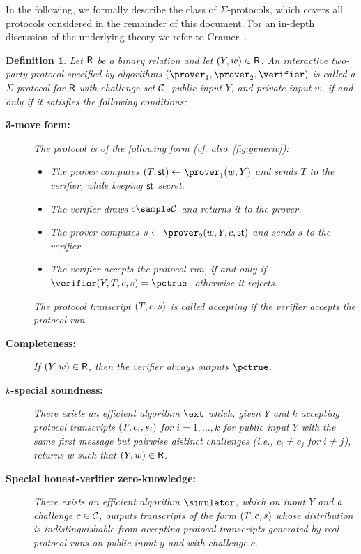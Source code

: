 \documentclass[runningheads,11pt]{article}
\newtheorem{definition}{Definition}
\begin{document}
In the following, we formally describe the class of $\Sigma$-protocols, which covers all protocols considered in the remainder of this document.
 For an in-depth discussion of the underlying theory we refer to Cramer~\cite{cramer97}.
\begin{definition}\label{def:sigma}
  Let $\mathsf{R}$ be a binary relation and let $(Y,w)\in\mathsf{R}$.
  An interactive two-party protocol specified by algorithms $(\prover_1,\prover_2,\verifier)$ is called a \emph{$\Sigma$-protocol} for $\mathsf{R}$ with challenge set $\mathcal{C}$, public input $Y$, and private input $w$, if and only if it satisfies the following conditions:
  \begin{description}
    \item[\bf 3-move form:]
      The protocol is of the following form (cf. also~\cref{fig:generic}):
      \begin{itemize}
        \item
          The prover computes $(\commitment,\st) \gets \prover_1(\witness,\statement)$ and sends $T$ to the verifier, while keeping $\mathsf{st}$ secret.
        \item
          The verifier draws $c\sample\CS$ and returns it to the prover.
        \item
          The prover computes $s\gets\prover_2(\witness,\statement,\challenge,\st)$ and sends $s$ to the verifier.
        \item
          The verifier accepts the protocol run, if and only if $\verifier(Y, T,\challenge,s)=\accept$, otherwise it rejects.
      \end{itemize}
      The protocol transcript $(T,c,s)$ is called \emph{accepting} if the verifier accepts the protocol run.
    \item[\bf Completeness:]
      If $(Y,w)\in\mathsf{R}$, then the verifier always outputs $\accept$.
    \item[\bf $k$-special soundness:]
      There exists an efficient algorithm $\ext$ which, given $Y$ and $k$ accepting protocol transcripts $(T,c_i,s_i)$ for $i=1,\dots,k$ for public input $Y$ with the same first message but pairwise distinct challenges (i.e., $c_i\ne c_j$ for $i\ne j$), returns $w$ such that $(Y,w)\in\mathsf{R}$.
      \item[\bf Special honest-verifier zero-knowledge:]
      There exists an efficient algorithm $\simulator$, which on input $Y$ and a challenge $c\in\mathcal{C}$, outputs transcripts of the form $(T,c,s)$ whose distribution is indistinguishable from accepting protocol transcripts generated by real protocol runs on public input $y$ and with challenge $c$.

\end{description}
\end{definition}
\end{document}

